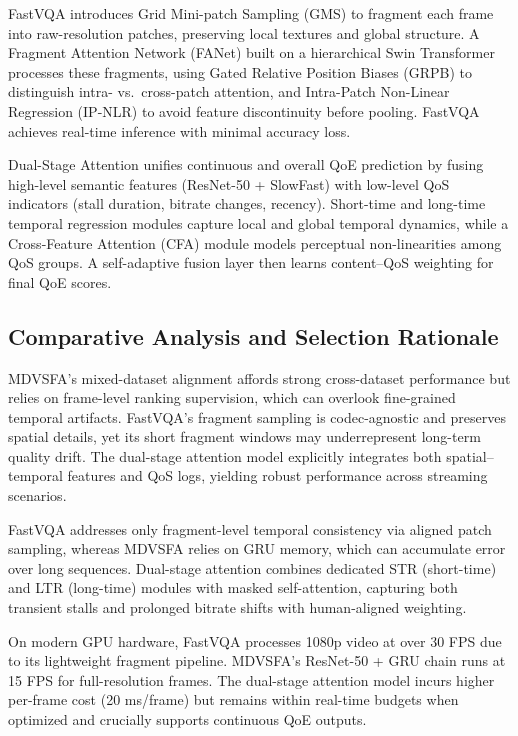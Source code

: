 FastVQA \cite{wu2022fastvqa} introduces Grid Mini-patch Sampling (GMS) to fragment each frame into raw-resolution patches, preserving local textures and global structure. A Fragment Attention Network (FANet) built on a hierarchical Swin Transformer processes these fragments, using Gated Relative Position Biases (GRPB) to distinguish intra- vs.\ cross-patch attention, and Intra-Patch Non-Linear Regression (IP-NLR) to avoid feature discontinuity before pooling. FastVQA achieves real-time inference with minimal accuracy loss.  

Dual-Stage Attention \cite{jia2024continuous} unifies continuous and overall QoE prediction by fusing high-level semantic features (ResNet-50 + SlowFast) with low-level QoS indicators (stall duration, bitrate changes, recency). Short-time and long-time temporal regression modules capture local and global temporal dynamics, while a Cross-Feature Attention (CFA) module models perceptual non-linearities among QoS groups. A self-adaptive fusion layer then learns content–QoS weighting for final QoE scores.

\subsection{Comparative Analysis and Selection Rationale}  
MDVSFA's mixed-dataset alignment affords strong cross-dataset performance but relies on frame-level ranking supervision, which can overlook fine-grained temporal artifacts. FastVQA's fragment sampling is codec-agnostic and preserves spatial details, yet its short fragment windows may underrepresent long-term quality drift. The dual-stage attention model explicitly integrates both spatial–temporal features and QoS logs, yielding robust performance across streaming scenarios.  

FastVQA addresses only fragment-level temporal consistency via aligned patch sampling, whereas MDVSFA relies on GRU memory, which can accumulate error over long sequences. Dual-stage attention combines dedicated STR (short-time) and LTR (long-time) modules with masked self-attention, capturing both transient stalls and prolonged bitrate shifts with human-aligned weighting.  

On modern GPU hardware, FastVQA processes 1080p video at over 30 FPS due to its lightweight fragment pipeline. MDVSFA's ResNet-50 + GRU chain runs at 15 FPS for full-resolution frames. The dual-stage attention model incurs higher per-frame cost (20 ms/frame) but remains within real-time budgets when optimized and crucially supports continuous QoE outputs.

